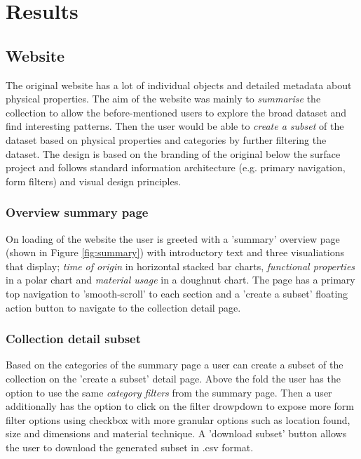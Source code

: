 \section{Results}

\subsection{Website}

The original website has a lot of individual objects and detailed metadata about physical properties. The aim of the website was mainly to \textit{summarise} the collection to allow the before-mentioned users to explore the broad dataset and find interesting patterns. Then the user would be able to  \textit{create a subset} of the dataset based on physical properties and categories by further filtering the dataset. The design is based on the branding of the original below the surface project and follows standard information architecture (e.g. primary navigation, form filters) and visual design principles.

\subsubsection{Overview summary page}
On loading of the website the user is greeted with a 'summary' overview page (shown in Figure \ref{fig:summary}) with introductory text and three visualiations that display; \textit{time of origin} in horizontal stacked bar charts, \textit{functional properties} in a polar chart and \textit{material usage} in a doughnut chart. The page has a primary top navigation to 'smooth-scroll' to each section and a 'create a subset' floating action button to navigate to the collection detail page.

\subsubsection{Collection detail subset}
Based on the categories of the summary page a user can create a subset of the collection on the 'create a subset' detail page. Above the fold the user has the option to use the same \textit{category filters} from the summary page. Then a user additionally has the option to click on the filter drowpdown to expose more form filter options using checkbox with more granular options such as location found, size and dimensions and material technique. A 'download subset' button allows the user to download the generated subset in .csv format.

